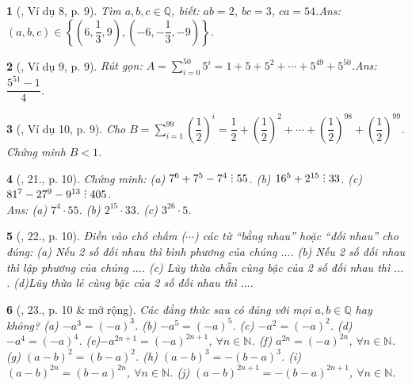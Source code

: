 \documentclass{article}
\newtheorem{baitoan}{}
\DeclareRobustCommand{\divby}{%
	\mathrel{\vbox{\baselineskip.65ex\lineskiplimit0pt\hbox{.}\hbox{.}\hbox{.}}}%
}
\begin{document}
\begin{baitoan}[\cite{Binh_Toan_7_tap_1}, Ví dụ 8, p. 9]
	Tìm $a,b,c\in\mathbb{Q}$, biết: $ab = 2$, $bc = 3$, $ca = 54$.\hfill{\sf Ans: $(a,b,c)\in\left\{\left(6,\dfrac{1}{3},9\right),\left(-6,-\dfrac{1}{3},-9\right)\right\}$.}
\end{baitoan}

\begin{baitoan}[\cite{Binh_Toan_7_tap_1}, Ví dụ 9, p. 9]
	Rút gọn: $A = \sum_{i=0}^{50} 5^i = 1 + 5 + 5^2 + \cdots + 5^{49} + 5^{50}$.\hfill{\sf Ans: $\dfrac{5^{51} - 1}{4}$.}
\end{baitoan}

\begin{baitoan}[\cite{Binh_Toan_7_tap_1}, Ví dụ 10, p. 9]
	Cho $B = \sum_{i=1}^{99} \left(\dfrac{1}{2}\right)^i = \dfrac{1}{2} + \left(\dfrac{1}{2}\right)^2 + \cdots + \left(\dfrac{1}{2}\right)^{98} + \left(\dfrac{1}{2}\right)^{99}$. Chứng minh $B < 1$.
\end{baitoan}

\begin{baitoan}[\cite{Binh_Toan_7_tap_1}, 21., p. 10]
	Chứng minh: (a) $7^6 + 7^5 - 7^4\divby 55$. (b) $16^5 + 2^{15}\divby 33$. (c) $81^7 - 27^9 - 9^{13}\divby 405$.\\\mbox{}\hfill{\sf Ans: (a) $7^4\cdot 55$. (b) $2^{15}\cdot 33$. (c) $3^{26}\cdot 5$.}
\end{baitoan}

\begin{baitoan}[\cite{Binh_Toan_7_tap_1}, 22., p. 10]
	Điền vào chỗ chấm ($\cdots$) các từ ``bằng nhau'' hoặc ``đối nhau'' cho đúng: (a) Nếu 2 số đối nhau thì bình phương của chúng $\ldots$. (b) Nếu 2 số đối nhau thì lập phương của chúng $\ldots$. (c) Lũy thừa chẵn cùng bậc của 2 số đối nhau thì $\ldots$. (d)Lũy thừa lẻ cùng bậc của 2 số đối nhau thì $\ldots$.
\end{baitoan}

\begin{baitoan}[\cite{Binh_Toan_7_tap_1}, 23., p. 10 \& mở rộng]
	Các đẳng thức sau có đúng với mọi $a,b\in\mathbb{Q}$ hay không? (a) $-a^3 = (-a)^3$. (b) $-a^5 = (-a)^5$. (c) $-a^2 = (-a)^2$. (d)$-a^4 = (-a)^4$. (e)$-a^{2n+1} = (-a)^{2n+1}$, $\forall n\in\mathbb{N}$. (f) $a^{2n} = (-a)^{2n}$, $\forall n\in\mathbb{N}$. (g) $(a - b)^2 = (b - a)^2$. (h) $(a - b)^3 = -(b - a)^3$. (i) $(a - b)^{2n} = (b - a)^{2n}$, $\forall n\in\mathbb{N}$. (j) $(a - b)^{2n+1} = -(b - a)^{2n+1}$, $\forall n\in\mathbb{N}$.
\end{baitoan}
\end{document}
